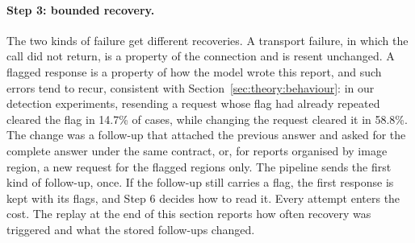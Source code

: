 \paragraph{Step 3: bounded recovery.} The two kinds of failure get different recoveries. A transport failure, in which the call did not return, is a property of the connection and is resent unchanged. A flagged response is a property of how the model wrote this report, and such errors tend to recur, consistent with Section~\ref{sec:theory:behaviour}: in our detection experiments, resending a request whose flag had already repeated cleared the flag in 14.7\% of cases, while changing the request cleared it in 58.8\%. The change was a follow-up that attached the previous answer and asked for the complete answer under the same contract, or, for reports organised by image region, a new request for the flagged regions only. The pipeline sends the first kind of follow-up, once. If the follow-up still carries a flag, the first response is kept with its flags, and Step 6 decides how to read it. Every attempt enters the cost. The replay at the end of this section reports how often recovery was triggered and what the stored follow-ups changed.

